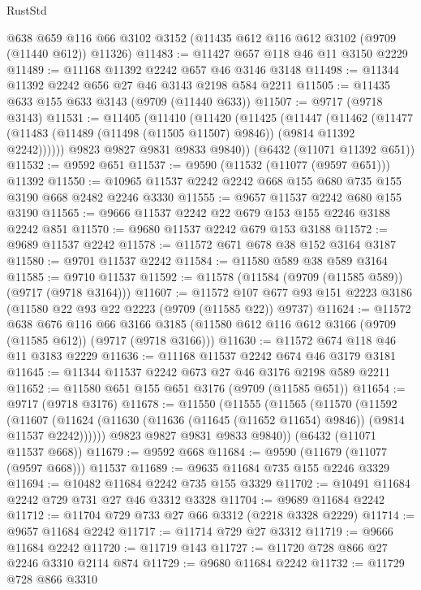 \begin{lexlean}{RustStd}
\begin{coremodule}
    @638
    @659
    @116
    @66
    @3102
    @3152
    (@11435 @612 @116 @612 @3102 (@9709 (@11440 @612)) @11326)
@11483 := @11427 @657 @118 @46 @11 @3150 @2229
@11489 := @11168 @11392 @2242 @657 @46 @3146 @3148
@11498 := @11344 @11392 @2242 @656 @27 @46 @3143 @2198 @584 @2211
@11505 := @11435 @633 @155 @633 @3143 (@9709 (@11440 @633))
@11507 := @9717 (@9718 @3143)
@11531 := @11405
    (@11410
      (@11420
        (@11425
          (@11447
            (@11462
              (@11477 (@11483 (@11489 (@11498 (@11505 @11507) @9846)) (@9814 @11392 @2242))))))
        @9823
        @9827
        @9831
        @9833
        @9840))
    (@6432 (@11071 @11392 @651))
@11532 := @9592 @651
@11537 := @9590 (@11532 (@11077 (@9597 @651))) @11392
@11550 := @10965 @11537 @2242 @2242 @668 @155 @680 @735 @155 @3190 @668 @2482 @2246 @3330
@11555 := @9657 @11537 @2242 @680 @155 @3190
@11565 := @9666 @11537 @2242 @22 @679 @153 @155 @2246 @3188 @2242 @851
@11570 := @9680 @11537 @2242 @679 @153 @3188
@11572 := @9689 @11537 @2242
@11578 := @11572 @671 @678 @38 @152 @3164 @3187
@11580 := @9701 @11537 @2242
@11584 := @11580 @589 @38 @589 @3164
@11585 := @9710 @11537
@11592 := @11578 (@11584 (@9709 (@11585 @589)) (@9717 (@9718 @3164)))
@11607 := @11572
    @107
    @677
    @93
    @151
    @2223
    @3186
    (@11580 @22 @93 @22 @2223 (@9709 (@11585 @22)) @9737)
@11624 := @11572
    @638
    @676
    @116
    @66
    @3166
    @3185
    (@11580 @612 @116 @612 @3166 (@9709 (@11585 @612)) (@9717 (@9718 @3166)))
@11630 := @11572 @674 @118 @46 @11 @3183 @2229
@11636 := @11168 @11537 @2242 @674 @46 @3179 @3181
@11645 := @11344 @11537 @2242 @673 @27 @46 @3176 @2198 @589 @2211
@11652 := @11580 @651 @155 @651 @3176 (@9709 (@11585 @651))
@11654 := @9717 (@9718 @3176)
@11678 := @11550
    (@11555
      (@11565
        (@11570
          (@11592
            (@11607
              (@11624 (@11630 (@11636 (@11645 (@11652 @11654) @9846)) (@9814 @11537 @2242))))))
        @9823
        @9827
        @9831
        @9833
        @9840))
    (@6432 (@11071 @11537 @668))
@11679 := @9592 @668
@11684 := @9590 (@11679 (@11077 (@9597 @668))) @11537
@11689 := @9635 @11684 @735 @155 @2246 @3329
@11694 := @10482 @11684 @2242 @735 @155 @3329
@11702 := @10491 @11684 @2242 @729 @731 @27 @46 @3312 @3328
@11704 := @9689 @11684 @2242
@11712 := @11704 @729 @733 @27 @66 @3312 (@2218 @3328 @2229)
@11714 := @9657 @11684 @2242
@11717 := @11714 @729 @27 @3312
@11719 := @9666 @11684 @2242
@11720 := @11719 @143
@11727 := @11720 @728 @866 @27 @2246 @3310 @2114 @874
@11729 := @9680 @11684 @2242
@11732 := @11729 @728 @866 @3310

\end{coremodule}
\end{lexlean}
